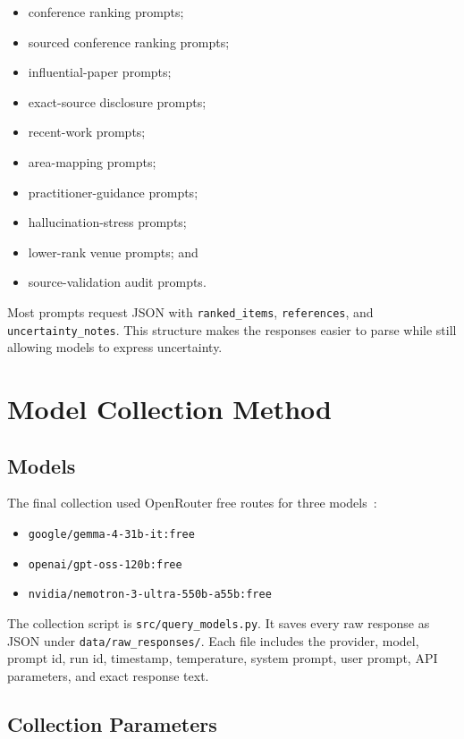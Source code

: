\documentclass[acmsmall,review,nonacm]{acmart}
\begin{document}
\begin{itemize}
  \item conference ranking prompts;
  \item sourced conference ranking prompts;
  \item influential-paper prompts;
  \item exact-source disclosure prompts;
  \item recent-work prompts;
  \item area-mapping prompts;
  \item practitioner-guidance prompts;
  \item hallucination-stress prompts;
  \item lower-rank venue prompts; and
  \item source-validation audit prompts.
\end{itemize}

Most prompts request JSON with \texttt{ranked\_items},
\texttt{references}, and \texttt{uncertainty\_notes}. This structure makes the
responses easier to parse while still allowing models to express uncertainty.

\section{Model Collection Method}

\subsection{Models}

The final collection used OpenRouter free routes for three
models~\cite{openrouter}:

\begin{itemize}
  \item \texttt{google/gemma-4-31b-it:free}
  \item \texttt{openai/gpt-oss-120b:free}
  \item \texttt{nvidia/nemotron-3-ultra-550b-a55b:free}
\end{itemize}

The collection script is \texttt{src/query\_models.py}. It saves every raw
response as JSON under \texttt{data/raw\_responses/}. Each file includes the
provider, model, prompt id, run id, timestamp, temperature, system prompt,
user prompt, API parameters, and exact response text.

\subsection{Collection Parameters}
\end{document}
